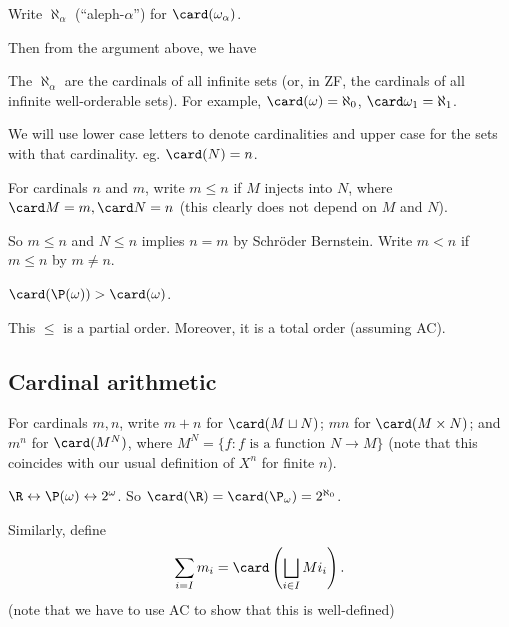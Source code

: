 \documentclass[a4paper]{article}
\begin{document}
\begin{defi}
  Write $\aleph_\alpha$ (``aleph-$\alpha$'') for $\card(\omega_\alpha)$.
\end{defi}

Then from the argument above, we have
\begin{thm}[]
  The $\aleph_\alpha$ are the cardinals of all infinite sets (or, in ZF, the cardinals of all infinite well-orderable sets). For example, $\card(\omega) = \aleph_0$, $\card \omega_1 = \aleph_1$.
\end{thm}

We will use lower case letters to denote cardinalities and upper case for the sets with that cardinality. eg. $\card(N) = n$.

\begin{defi}
  For cardinals $n$ and $m$, write $m \leq n$ if $M$ injects into $N$, where $\card M = m, \card N = n$ (this clearly does not depend on $M$ and $N$).

  So $m \leq n$ and $N\leq n$ implies $n = m$ by Schr\"oder Bernstein. Write $ m < n$ if $m \leq n$ by $m\not = n$.
\end{defi}

\begin{eg}
  $\card(\P(\omega)) > \card(\omega)$.
\end{eg}

This $\leq$ is a partial order. Moreover, it is a total order (assuming AC).

\subsection{Cardinal arithmetic}
\begin{defi}
  For cardinals $m, n$, write $m + n$ for $\card(M\sqcup N)$; $mn$ for $\card(M\times N)$; and $m^n$ for $\card(M^N)$, where $M^N = \{f: f\text{ is a function }N\to M\}$ (note that this coincides with our usual definition of $X^n$ for finite $n$).
\end{defi}

\begin{eg}
  $\R \leftrightarrow \P(\omega) \leftrightarrow 2^\omega$. So $\card(\R) = \card(\P_\omega) = 2^{\aleph_0}$.
\end{eg}

Similarly, define
\[
  \sum_{i = I} m_i = \card\left(\bigsqcup_{i\in I} Mi_i\right).
\]
(note that we have to use AC to show that this is well-defined)
\end{document}
